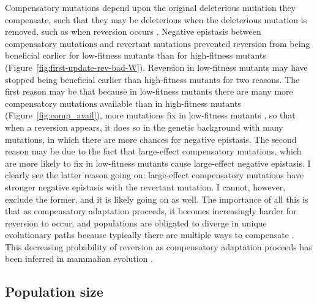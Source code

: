 \begin{doublespace}
Compensatory mutations depend upon the original deleterious mutation
they compensate, such that they may be deleterious when the deleterious mutation
is removed, such as when reversion occurs \citep{sch97,poo05,lev00}.
%
Negative epistasis between compensatory mutations and revertant mutations
prevented reversion from being beneficial earlier for low-fitness mutants
than for high-fitness mutants (Figure~\ref{fig:first-update-rev-bad-W}).
%
Reversion in low-fitness mutants may have stopped being beneficial earlier
than high-fitness mutants for two reasons.
%
The first reason may be that because in low-fitness mutants
there are many more compensatory mutations available
than in high-fitness mutants (Figure~\ref{fig:comp_avail}),
more mutations fix in low-fitness mutants \citep{moo00,san05}, so that
when a reversion appears, it does so in the genetic background
with many mutations, in which there are more chances for negative epistasis.
%
The second reason may be due to the fact that large-effect
compensatory mutations, which are more likely to fix in low-fitness mutants
cause large-effect negative epistasis.
%
I clearly see the latter reason going on: large-effect compensatory mutations
have stronger negative epistasis with the revertant mutation.
%
I cannot, however, exclude the former, and it is likely going on as well.
%
The importance of all this is that as compensatory adaptation proceeds,
it becomes increasingly harder for reversion to occur,
and populations are obligated to diverge in unique evolutionary paths
because typically there are multiple ways to compensate \citep{pau07}.
%
This decreasing probability of reversion as compensatory adaptation proceeds
has been inferred in mammalian evolution \citep{soy12}.



\subsection{Population size}


\end{doublespace}
